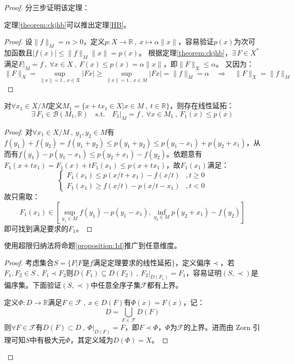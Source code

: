 \begin{proof}分三步证明该定理：
\begin{proposition}
定理\ref{theorem:ckjhb}可以推出定理\ref{HB}。
\end{proposition}
\begin{proof}
设$\|f\|_M=\alpha>0$，定义$p:X \to \mathbb{R} \ , \ x \mapsto \alpha\|x\|$，容易验证$p(x)$为次可加函数且$|f(x)| \leq \|f\|_M\|x\|=p(x)$。
根据定理\ref{theorem:ckjhb}，$\exists \, F \in X^*$满足$F|_M=f \ , \ \forall x \in X \ , \ F(x) \leq p(x)=\alpha \|x\|$，即$\|F\|_X \leq \alpha$。
又因为：
\[\|F\|_X=\sup_{\|x\|=1 \ , \ x \in X}|Fx| \geq \sup_{\|x\|=1 \ , \ x \in M}|Fx|=\|f\|_M=\alpha \quad \Rightarrow \quad \|F\|_X=\|f\|_M\]
\end{proof}
\begin{proposition}\label{proposition:1d}
对$\forall x_1 \in X/M$定义$M_1=\{x+tx_1 \in X|x \in M \ , \ t \in \mathbb{R}\}$，则存在线性延拓：
\[\exists \, F_1 \in \mathscr{B}(M_1,\mathbb{R}) \quad \text{s.t.} \quad F_1|_M=f \ , \ \forall x \in M_1 \ , \ F_1(x) \leq p(x)\]
\end{proposition}
\begin{proof}对$\forall x_1 \in X/M \ , \ y_1,y_2 \in M$有$f(y_1)+f(y_2)=f(y_1+y_2) \leq p(y_1+y_2) \leq p(y_1-x_1) + p(y_2+x_1)$，从而有$f(y_1)-p(y_1-x_1) \leq p(y_2+x_1)-f(y_2)$。依题意有$F_1(x+tx_1)=F_1(x)+tF_1(x_1) \leq p(x+tx_1)$，故$F_1(x_1)$满足：
\[\left\{
\begin{array}{ll}
    F_1(x_1) \leq p(x/t+x_1)-f(x/t) & ,t \geq 0 \\
    F_1(x_1) \geq f(x/t)-p(x/t-x_1) & ,t < 0
\end{array}
\right.\]
故只需取：
\[F_1(x_1) \in \left[\sup_{y_1 \in M}f(y_1)-p(y_1-x_1),\inf_{y_2 \in M}p(y_2+x_1)-f(y_2)\right]\]
即可找到满足要求的$F_1$。
\end{proof}
\begin{proposition}
使用超限归纳法将命题\ref{proposition:1d}推广到任意维度。
\end{proposition}
\begin{proof}
考虑集合$S=\{F|F\text{是}f\text{满足定理要求的线性延拓}\}$，定义偏序$\prec$，若$F_1,F_2 \in S \ , \ F_1 \prec F_2$则$D(F_1) \subseteq D(F_2) \ , \ F_2|_{D(F_1)}=F_1$，容易证明$(S,\prec)$是偏序集。下面验证$(S,\prec)$中任意全序子集$\mathscr{F}$都有上界。

定义$\Phi:D \to \mathbb{R}$满足$F \in \mathscr{F} \ , \ x \in D(F)$有$\Phi(x)=F(x)$，记：
\[D=\bigcup_{F \in \mathscr{F}}D(F)\]
则$\forall F \in \mathscr{F}$有$D(F) \subset D \ , \ \Phi|_{D(F)}=F$，即$F \prec \Phi$，$\Phi$为$\mathscr{F}$的上界。进而由 Zorn 引理可知$S$中有极大元$\Phi$，其定义域为$D(\Phi)=X$。
\end{proof}
\end{proof}
